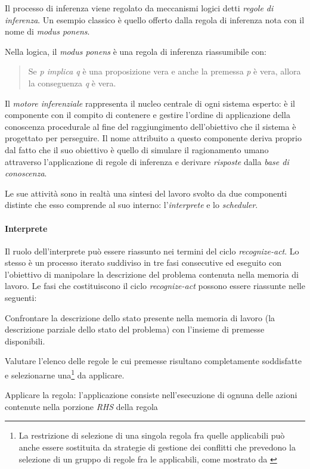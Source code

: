 Il processo di inferenza viene regolato da meccanismi logici detti \emph{regole di inferenza}. Un esempio classico è quello offerto dalla regola di inferenza nota con il nome di \emph{modus ponens}.

Nella logica, il \emph{modus ponens} è una regola di inferenza riassumibile con: \begin{quote}
Se \emph{p implica q} è una proposizione vera e anche la premessa \emph{p} è vera, allora la conseguenza \emph{q} è vera.
\end{quote}

Il \emph{motore inferenziale} rappresenta il nucleo centrale di ogni sistema esperto: è il componente con il compito di contenere e gestire l'ordine di applicazione della conoscenza procedurale al fine del raggiungimento dell'obiettivo che il sistema è progettato per perseguire. Il nome attribuito a questo componente deriva proprio dal fatto che il suo obiettivo è quello di simulare il ragionamento umano attraverso l'applicazione di regole di inferenza e derivare \emph{risposte} dalla \emph{base di conoscenza}.

Le sue attività sono in realtà una sintesi del lavoro svolto da due componenti distinte che esso comprende al suo interno: l'\emph{interprete} e lo \emph{scheduler}.~\cite{development1993}

\paragraph{Interprete} Il ruolo dell'interprete può essere riassunto nei termini del ciclo \emph{recognize-act}. Lo stesso è un processo iterato suddiviso in tre fasi consecutive ed eseguito con l'obiettivo di manipolare la descrizione del problema contenuta nella memoria di lavoro. Le fasi che costituiscono il ciclo \emph{recognize-act} possono essere riassunte nelle seguenti:
\begin{list}{}{}
	\item[(1)] Confrontare la descrizione dello stato presente nella memoria di lavoro (la descrizione parziale dello stato del problema) con l'insieme di premesse disponibili.
	\item[(2)] Valutare l'elenco delle regole le cui premesse risultano completamente soddisfatte e selezionarne una\footnote{La restrizione di selezione di una singola regola fra quelle applicabili può anche essere sostituita da strategie di gestione dei conflitti che prevedono la selezione di un gruppo di regole fra le applicabili, come mostrato da \cite{Doorenbos95productionmatching}} da applicare.
	\item[(3)] Applicare la regola: l'applicazione consiste nell'esecuzione di ognuna delle azioni contenute nella porzione \emph{RHS} della regola
\end{list}

